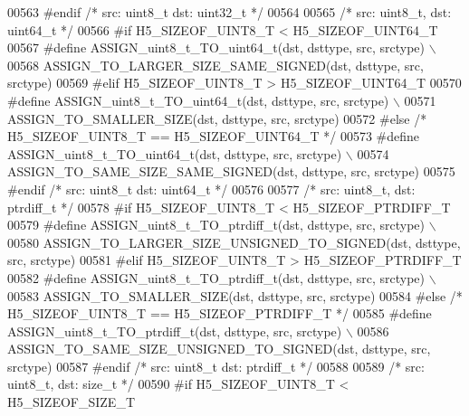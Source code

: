 \begin{DoxyCode}
00563 \textcolor{preprocessor}{#endif }\textcolor{comment}{/* src: uint8\_t dst: uint32\_t */}\textcolor{preprocessor}{}
00564 
00565 \textcolor{comment}{/* src: uint8\_t, dst: uint64\_t */}
00566 \textcolor{preprocessor}{#if H5\_SIZEOF\_UINT8\_T < H5\_SIZEOF\_UINT64\_T}
00567 \textcolor{preprocessor}{    #define ASSIGN\_uint8\_t\_TO\_uint64\_t(dst, dsttype, src, srctype) \(\backslash\)}
00568 \textcolor{preprocessor}{        ASSIGN\_TO\_LARGER\_SIZE\_SAME\_SIGNED(dst, dsttype, src, srctype)}
00569 \textcolor{preprocessor}{#elif H5\_SIZEOF\_UINT8\_T > H5\_SIZEOF\_UINT64\_T}
00570 \textcolor{preprocessor}{    #define ASSIGN\_uint8\_t\_TO\_uint64\_t(dst, dsttype, src, srctype) \(\backslash\)}
00571 \textcolor{preprocessor}{        ASSIGN\_TO\_SMALLER\_SIZE(dst, dsttype, src, srctype)}
00572 \textcolor{preprocessor}{#else }\textcolor{comment}{/* H5\_SIZEOF\_UINT8\_T == H5\_SIZEOF\_UINT64\_T */}\textcolor{preprocessor}{}
00573 \textcolor{preprocessor}{    #define ASSIGN\_uint8\_t\_TO\_uint64\_t(dst, dsttype, src, srctype) \(\backslash\)}
00574 \textcolor{preprocessor}{        ASSIGN\_TO\_SAME\_SIZE\_SAME\_SIGNED(dst, dsttype, src, srctype)}
00575 \textcolor{preprocessor}{#endif }\textcolor{comment}{/* src: uint8\_t dst: uint64\_t */}\textcolor{preprocessor}{}
00576 
00577 \textcolor{comment}{/* src: uint8\_t, dst: ptrdiff\_t */}
00578 \textcolor{preprocessor}{#if H5\_SIZEOF\_UINT8\_T < H5\_SIZEOF\_PTRDIFF\_T}
00579 \textcolor{preprocessor}{    #define ASSIGN\_uint8\_t\_TO\_ptrdiff\_t(dst, dsttype, src, srctype) \(\backslash\)}
00580 \textcolor{preprocessor}{        ASSIGN\_TO\_LARGER\_SIZE\_UNSIGNED\_TO\_SIGNED(dst, dsttype, src, srctype)}
00581 \textcolor{preprocessor}{#elif H5\_SIZEOF\_UINT8\_T > H5\_SIZEOF\_PTRDIFF\_T}
00582 \textcolor{preprocessor}{    #define ASSIGN\_uint8\_t\_TO\_ptrdiff\_t(dst, dsttype, src, srctype) \(\backslash\)}
00583 \textcolor{preprocessor}{        ASSIGN\_TO\_SMALLER\_SIZE(dst, dsttype, src, srctype)}
00584 \textcolor{preprocessor}{#else }\textcolor{comment}{/* H5\_SIZEOF\_UINT8\_T == H5\_SIZEOF\_PTRDIFF\_T */}\textcolor{preprocessor}{}
00585 \textcolor{preprocessor}{    #define ASSIGN\_uint8\_t\_TO\_ptrdiff\_t(dst, dsttype, src, srctype) \(\backslash\)}
00586 \textcolor{preprocessor}{        ASSIGN\_TO\_SAME\_SIZE\_UNSIGNED\_TO\_SIGNED(dst, dsttype, src, srctype)}
00587 \textcolor{preprocessor}{#endif }\textcolor{comment}{/* src: uint8\_t dst: ptrdiff\_t */}\textcolor{preprocessor}{}
00588 
00589 \textcolor{comment}{/* src: uint8\_t, dst: size\_t */}
00590 \textcolor{preprocessor}{#if H5\_SIZEOF\_UINT8\_T < H5\_SIZEOF\_SIZE\_T}

\end{DoxyCode}
